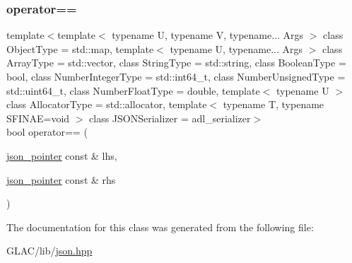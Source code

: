 \mbox{\label{classnlohmann_1_1basic__json_1_1json__pointer_a4667ef558c8c3f8a646bfda0c6654653}} 
\subsubsection{\texorpdfstring{operator==}{operator==}}
{\footnotesize\ttfamily template$<$template$<$ typename U, typename V, typename... Args $>$ class Object\+Type = std\+::map, template$<$ typename U, typename... Args $>$ class Array\+Type = std\+::vector, class String\+Type  = std\+::string, class Boolean\+Type  = bool, class Number\+Integer\+Type  = std\+::int64\+\_\+t, class Number\+Unsigned\+Type  = std\+::uint64\+\_\+t, class Number\+Float\+Type  = double, template$<$ typename U $>$ class Allocator\+Type = std\+::allocator, template$<$ typename T, typename S\+F\+I\+N\+A\+E=void $>$ class J\+S\+O\+N\+Serializer = adl\+\_\+serializer$>$ \\
bool operator== (\begin{DoxyParamCaption}\item[{\mbox{\hyperlink{classnlohmann_1_1basic__json_1_1json__pointer}{json\+\_\+pointer}} const \&}]{lhs,  }\item[{\mbox{\hyperlink{classnlohmann_1_1basic__json_1_1json__pointer}{json\+\_\+pointer}} const \&}]{rhs }\end{DoxyParamCaption})\hspace{0.3cm}{\ttfamily [friend]}}



The documentation for this class was generated from the following file\+:\begin{DoxyCompactItemize}
\item 
G\+L\+A\+C/lib/\mbox{\hyperlink{json_8hpp}{json.\+hpp}}\end{DoxyCompactItemize}
